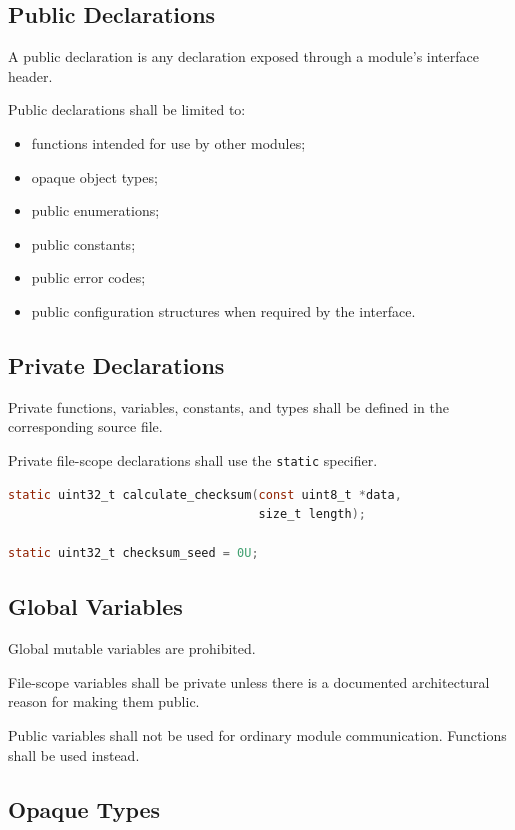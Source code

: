 \subsection{Public Declarations}

A public declaration is any declaration exposed through a module's interface header.

Public declarations shall be limited to:

\begin{itemize}
	\item functions intended for use by other modules;
	\item opaque object types;
	\item public enumerations;
	\item public constants;
	\item public error codes;
	\item public configuration structures when required by the interface.
\end{itemize}

\subsection{Private Declarations}

Private functions, variables, constants, and types shall be defined in the corresponding source file.

Private file-scope declarations shall use the \texttt{static} specifier.

\begin{lstlisting}[language=C]
static uint32_t calculate_checksum(const uint8_t *data,
                                   size_t length);

static uint32_t checksum_seed = 0U;
\end{lstlisting}

\subsection{Global Variables}

Global mutable variables are prohibited.

File-scope variables shall be private unless there is a documented architectural reason for making them public.

Public variables shall not be used for ordinary module communication. Functions shall be used instead.

\subsection{Opaque Types}

